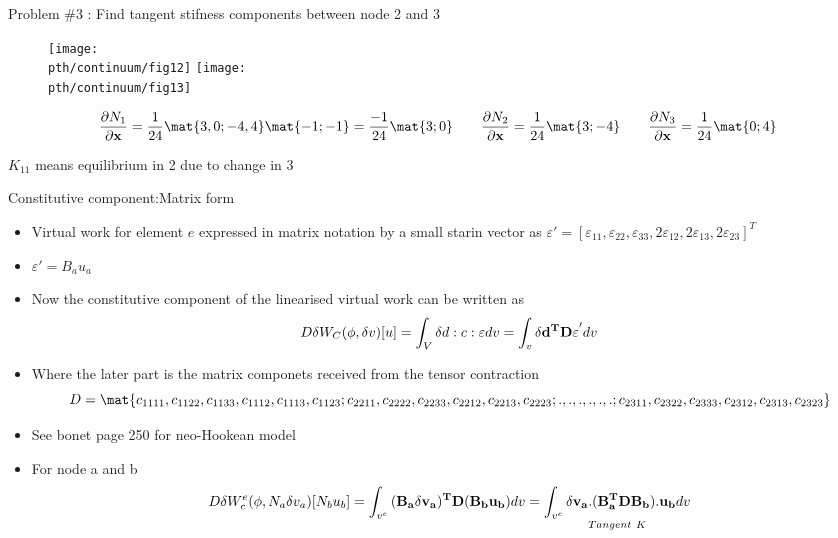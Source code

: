  
 	\begin{frame}{Problem \#3 : Find tangent stifness components between node 2 and 3}
		\begin{figure}
 			\centering
 			\texttt{[image: \\pth/continuum/fig12]} 	\texttt{[image: \\pth/continuum/fig13]}
 		\end{figure}
 	
 		{\tiny
		\begin{equation}
		 	\begin{aligned}
		 	\frac{\partial N_1}{\partial \ve{x}} = \frac{1}{24}\mat{3,0;-4,4}\mat{-1;-1} = \frac{-1}{24}\mat{3;0} \qquad 	\frac{\partial N_2}{\partial \ve{x}}  = \frac{1}{24}\mat{3;-4} \qquad \frac{\partial N_3}{\partial \ve{x}}  = \frac{1}{24}\mat{0;4}
	 	\end{aligned}
 		\end{equation}}
 	
 	$K_{11}$ means equilibrium in 2 due to change in 3
 	\end{frame}
 
 
 	\begin{frame}{Constitutive component:Matrix form}
 		\begin{itemize}
 			\item Virtual work for element $e$ expressed in matrix notation by a small starin vector as 
 			$\varepsilon' = [\varepsilon_{11},\varepsilon_{22},\varepsilon_{33},2\varepsilon_{12},2\varepsilon_{13},2\varepsilon_{23}]^T$
 			\item $\varepsilon' = B_au_a$
 			\item Now the constitutive component of the linearised virtual work can be written as
 			\begin{equation}
 			D\delta W_C(\phi,\delta v)[u] = \int_V \delta d :c:\varepsilon dv = \int_v \delta \mathbf{d^TD\varepsilon}' dv
 			\end{equation}
 			\item Where the later part is the matrix componets received from the tensor contraction
 			\begin{equation}
 				D = \mat{c_{1111},c_{1122},c_{1133},c_{1112},c_{1113},c_{1123};
 						 c_{2211},c_{2222},c_{2233},c_{2212},c_{2213},c_{2223};
 						 .,.,.,.,.,.;
 					     c_{2311},c_{2322},c_{2333},c_{2312},c_{2313},c_{2323}}
 			\end{equation}
 			\item See bonet page 250 for neo-Hookean model
 			\item For node a and b
 			\begin{equation}
 				D\delta W_c^e(\phi,N_a\delta v_a)[N_b u_b] = \int_{v^e} \mathbf{(B_a \delta v_a)^TD(B_b u_b)} dv =  \underset{Tangent~ K}{\int_{v^e} \mathbf{\delta v_a.(B_a ^TDB_b ).u_b} dv}
 			\end{equation}
 		\end{itemize}
 	\end{frame}
 
